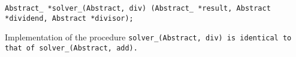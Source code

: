 
\tt{Abstract_ *solver_(Abstract, div)%
(Abstract_ *result, Abstract *dividend, Abstract *divisor);}


Implementation of the procedure \tt{solver_(Abstract, div)}
is identical to that of \tt{solver_(Abstract, add)}.
